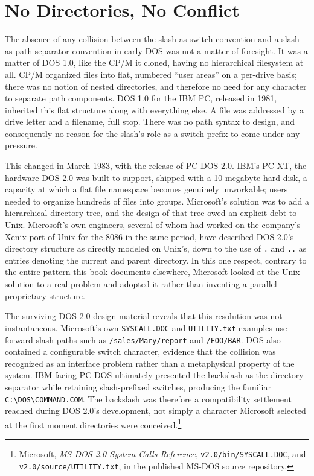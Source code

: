 \documentclass[11pt]{book}
\begin{document}
\section{No Directories, No Conflict}

The absence of any collision between the slash-as-switch convention and a slash-as-path-separator convention in early DOS was not a matter of foresight. It was a matter of DOS 1.0, like the CP/M it cloned, having no hierarchical filesystem at all. CP/M organized files into flat, numbered ``user areas'' on a per-drive basis; there was no notion of nested directories, and therefore no need for any character to separate path components. DOS 1.0 for the IBM PC, released in 1981, inherited this flat structure along with everything else. A file was addressed by a drive letter and a filename, full stop. There was no path syntax to design, and consequently no reason for the slash's role as a switch prefix to come under any pressure.

This changed in March 1983, with the release of PC-DOS 2.0. IBM's PC XT, the hardware DOS 2.0 was built to support, shipped with a 10-megabyte hard disk, a capacity at which a flat file namespace becomes genuinely unworkable; users needed to organize hundreds of files into groups. Microsoft's solution was to add a hierarchical directory tree, and the design of that tree owed an explicit debt to Unix. Microsoft's own engineers, several of whom had worked on the company's Xenix port of Unix for the 8086 in the same period, have described DOS 2.0's directory structure as directly modeled on Unix's, down to the use of \texttt{.} and \texttt{..} as entries denoting the current and parent directory. In this one respect, contrary to the entire pattern this book documents elsewhere, Microsoft looked at the Unix solution to a real problem and adopted it rather than inventing a parallel proprietary structure.

The surviving DOS 2.0 design material reveals that this resolution was not instantaneous. Microsoft's own \texttt{SYSCALL.DOC} and \texttt{UTILITY.txt} examples use forward-slash paths such as \texttt{/sales/Mary/report} and \texttt{/FOO/BAR}. DOS also contained a configurable switch character, evidence that the collision was recognized as an interface problem rather than a metaphysical property of the system. IBM-facing PC-DOS ultimately presented the backslash as the directory separator while retaining slash-prefixed switches, producing the familiar \texttt{C:\textbackslash{}DOS\textbackslash{}COMMAND.COM}. The backslash was therefore a compatibility settlement reached during DOS 2.0's development, not simply a character Microsoft selected at the first moment directories were conceived.\footnote{Microsoft, \emph{MS-DOS 2.0 System Calls Reference}, \texttt{v2.0/bin/SYSCALL.DOC}, and \texttt{v2.0/source/UTILITY.txt}, in the published MS-DOS source repository.}
\end{document}

